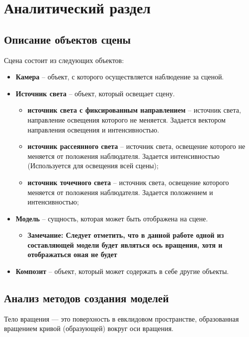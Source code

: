 \chapter{Аналитический раздел}

\section{Описание объектов сцены}

Сцена состоит из следующих объектов:
\begin{itemize}
    \item \textbf{Камера} -- объект, с которого осуществляется наблюдение за сценой.
    \item \textbf{Источник света} -- объект, который освещает сцену.
    \begin{itemize}
        \item \textbf{источник света с фиксированным направлением} -- источник света, направление освещения которого не меняется. Задается вектором направления освещения и интенсивностью.
        \item \textbf{источник рассеянного света} -- источник света, освещение которого не меняется от положения наблюдателя. Задается интенсивностью (Используется для освещения всей сцены);
        \item \textbf{источник точечного света} -- источник света, освещение которого меняется от положения наблюдателя. Задается положением и интенсивностью;
    \end{itemize}
    \item \textbf{Модель} -- сущность, которая может быть отображена на сцене.
    \begin{itemize}
        \item \textbf{Замечание: Следует отметить, что в данной работе одной из составляющей модели будет являться ось вращения, хотя и отображаться оная не будет}
    \end{itemize}

    \item \textbf{Композит} -- объект, который может содержать в себе другие объекты.
\end{itemize}

\section{Анализ методов создания моделей}
Тело вращения — это поверхность в евклидовом пространстве,
образованная вращением кривой (образующей) вокруг оси вращения.\cite{revolution}

